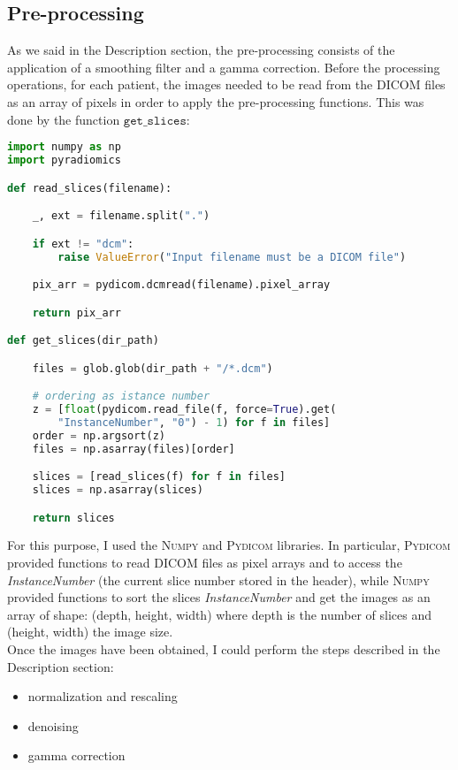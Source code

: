 \documentclass{standalone}
\begin{document}
\subsection{Pre-processing}

As we said in the Description section, the pre-processing consists of the application of a smoothing filter and a gamma correction.
Before the processing operations, for each patient, the images needed to be read from the DICOM files as an array of pixels in order to apply the pre-processing functions.
This was done by the function $\mathtt{get\_slices}$: 

\begin{lstlisting}[language = python, caption=$\mathtt{get\_slices}$ implementation]
import numpy as np 
import pyradiomics

def read_slices(filename):

    _, ext = filename.split(".")

    if ext != "dcm":
        raise ValueError("Input filename must be a DICOM file")

    pix_arr = pydicom.dcmread(filename).pixel_array

    return pix_arr

def get_slices(dir_path)

    files = glob.glob(dir_path + "/*.dcm")

    # ordering as istance number
    z = [float(pydicom.read_file(f, force=True).get(
        "InstanceNumber", "0") - 1) for f in files]
    order = np.argsort(z)
    files = np.asarray(files)[order]

    slices = [read_slices(f) for f in files]
    slices = np.asarray(slices)

    return slices

\end{lstlisting}

For this purpose, I used the \textsc{Numpy} \cite{Numpy} and \textsc{Pydicom} \cite{Pydicom} libraries.
In particular, \textsc{Pydicom} provided functions to read DICOM files as pixel arrays and to access the \textit{InstanceNumber} (the current slice number stored in the header), while \textsc{Numpy} provided functions to sort the slices \textit{InstanceNumber} and get the images as an array of shape: (depth, height, width) where depth is the number of slices and (height, width) the image size.
\\
Once the images have been obtained, I could perform the steps described in the Description section:
\begin{itemize}
    \item normalization and rescaling
    \item denoising
    \item gamma correction
\end{itemize}
\end{document}
